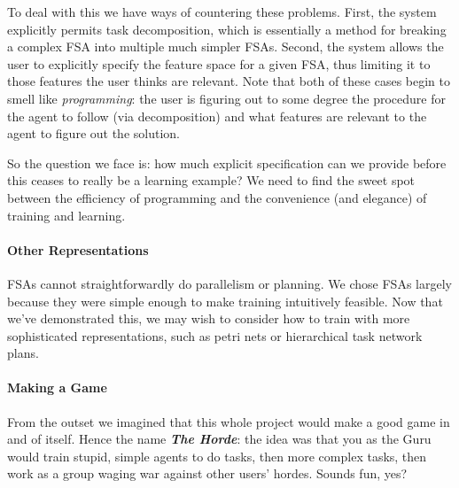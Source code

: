 \documentclass[11pt]{article}
\begin{document}
To deal with this we have ways of countering these problems.  First, the system explicitly permits task decomposition, which is essentially a method for breaking a complex FSA into multiple much simpler FSAs.  Second, the system allows the user to explicitly specify the feature space for a given FSA, thus limiting it to those features the user thinks are relevant.  Note that both of these cases begin to smell like {\it programming}: the user is figuring out to some degree the procedure for the agent to follow (via decomposition) and what features are relevant to the agent to figure out the solution. 

So the question we face is: how much explicit specification can we provide before this ceases to really be a learning example?  We need to find the sweet spot between the efficiency of programming and the convenience (and elegance) of training and learning.

\paragraph{Other Representations}  FSAs cannot straightforwardly do parallelism or planning.  We chose FSAs largely because they were simple enough to make training intuitively feasible.  Now that we've demonstrated this, we may wish to consider how to train with more sophisticated representations, such as petri nets or hierarchical task network plans.

\paragraph{Making a Game}  From the outset we imagined that this whole project would make a good game in and of itself.  Hence the name {\bf \textit{The Horde}}: the idea was that you as the Guru would train stupid, simple agents to do tasks, then more complex tasks, then work as a group waging war against other users' hordes.  Sounds fun, yes?
\end{document}

